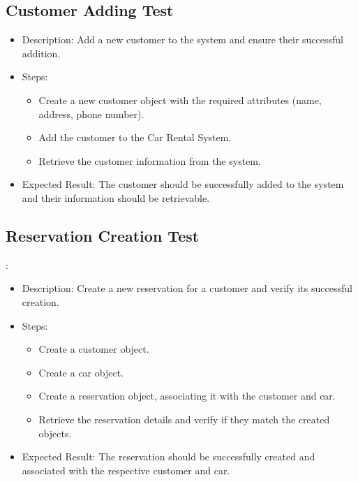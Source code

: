 \documentclass{article}
\begin{document}
\subsection{Customer Adding Test}
\begin{itemize}
\item Description: Add a new customer to the system and ensure their successful addition.
\item Steps:
\begin{itemize}
\item Create a new customer object with the required attributes (name, address, phone number).
\item Add the customer to the Car Rental System.
\item Retrieve the customer information from the system.
\end{itemize}
\item Expected Result: The customer should be successfully added to the system and their information should be retrievable.
\end{itemize}

\subsection{Reservation Creation Test}:
\begin{itemize}
    \item Description: Create a new reservation for a customer and verify its successful creation.
    \item Steps:
        \begin{itemize}
            \item Create a customer object.
            \item Create a car object.
            \item Create a reservation object, associating it with the customer and car.
            \item Retrieve the reservation details and verify if they match the created objects.
        \end{itemize}
    \item Expected Result: The reservation should be successfully created and associated with the respective customer and car.
\end{itemize}
\end{document}

